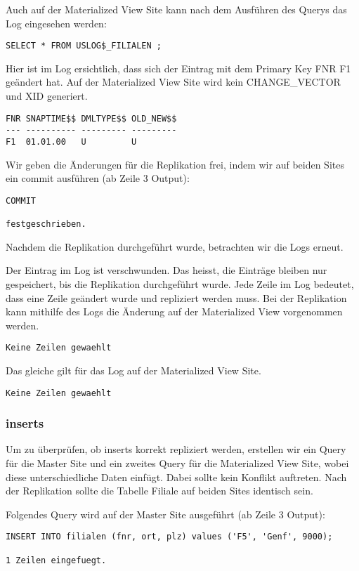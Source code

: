 \documentclass[11pt,a4paper,parskip=half]{scrartcl}
\begin{document}
Auch auf der Materialized View Site kann nach dem Ausführen des Querys das Log eingesehen werden:
\begin{lstlisting}
SELECT * FROM USLOG$_FILIALEN ;
\end{lstlisting}

Hier ist im Log ersichtlich, dass sich der Eintrag mit dem Primary Key FNR F1 geändert hat. Auf der Materialized View Site wird kein CHANGE\_VECTOR und XID generiert.
\begin{lstlisting}
FNR SNAPTIME$$ DMLTYPE$$ OLD_NEW$$
--- ---------- --------- ---------
F1  01.01.00   U         U         
\end{lstlisting}

Wir geben die Änderungen für die Replikation frei, indem wir auf beiden Sites ein commit ausführen (ab Zeile 3 Output):
\begin{lstlisting}
COMMIT

festgeschrieben.
\end{lstlisting}

Nachdem die Replikation durchgeführt wurde, betrachten wir die Logs erneut.

Der Eintrag im Log ist verschwunden. Das heisst, die Einträge bleiben nur gespeichert, bis die Replikation durchgeführt wurde. Jede Zeile im Log bedeutet, dass eine Zeile geändert wurde und repliziert werden muss. Bei der Replikation kann mithilfe des Logs die Änderung auf der Materialized View vorgenommen werden.
\begin{lstlisting}
Keine Zeilen gewaehlt
\end{lstlisting}

Das gleiche gilt für das Log auf der Materialized View Site.
\begin{lstlisting}
Keine Zeilen gewaehlt
\end{lstlisting}

\subsubsection{inserts}
Um zu überprüfen, ob inserts korrekt repliziert werden, erstellen wir ein Query für die Master Site und ein zweites Query für die Materialized View Site, wobei diese unterschiedliche Daten einfügt. Dabei sollte kein Konflikt auftreten. Nach der Replikation sollte die Tabelle Filiale auf beiden Sites identisch sein.

Folgendes Query wird auf der Master Site ausgeführt (ab Zeile 3 Output):
\begin{lstlisting}
INSERT INTO filialen (fnr, ort, plz) values ('F5', 'Genf', 9000);

1 Zeilen eingefuegt.
\end{lstlisting}
\end{document}
